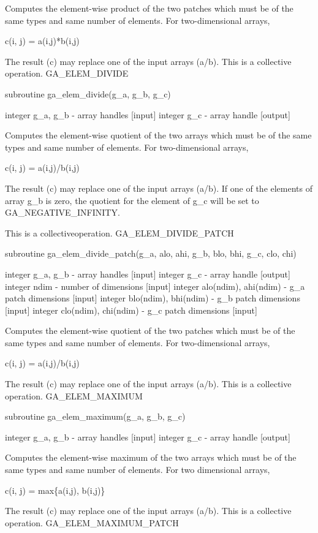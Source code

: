 Computes the element-wise product of the two patches which must be
of the same types and same number of elements. For two-dimensional
arrays,

c(i, j) = a(i,j){*}b(i,j)

The result (c) may replace one of the input arrays (a/b). This is
a collective operation. GA\_ELEM\_DIVIDE

subroutine ga\_elem\_divide(g\_a, g\_b, g\_c)

integer g\_a, g\_b - array handles {[}input{]} integer g\_c - array
handle {[}output{]}

Computes the element-wise quotient of the two arrays which must be
of the same types and same number of elements. For two-dimensional
arrays,

c(i, j) = a(i,j)/b(i,j)

The result (c) may replace one of the input arrays (a/b). If one of
the elements of array g\_b is zero, the quotient for the element of
g\_c will be set to GA\_NEGATIVE\_INFINITY.

This is a collectiveoperation. GA\_ELEM\_DIVIDE\_PATCH

subroutine ga\_elem\_divide\_patch(g\_a, alo, ahi, g\_b, blo, bhi,
g\_c, clo, chi)

integer g\_a, g\_b - array handles {[}input{]} integer g\_c - array
handle {[}output{]} integer ndim - number of dimensions {[}input{]}
integer alo(ndim), ahi(ndim) - g\_a patch dimensions {[}input{]} integer
blo(ndim), bhi(ndim) - g\_b patch dimensions {[}input{]} integer clo(ndim),
chi(ndim) - g\_c patch dimensions {[}input{]}

Computes the element-wise quotient of the two patches which must be
of the same types and same number of elements. For two-dimensional
arrays,

c(i, j) = a(i,j)/b(i,j)

The result (c) may replace one of the input arrays (a/b). This is
a collective operation. GA\_ELEM\_MAXIMUM

subroutine ga\_elem\_maximum(g\_a, g\_b, g\_c)

integer g\_a, g\_b - array handles {[}input{]} integer g\_c - array
handle {[}output{]}

Computes the element-wise maximum of the two arrays which must be
of the same types and same number of elements. For two dimensional
arrays,

c(i, j) = max\{a(i,j), b(i,j)\}

The result (c) may replace one of the input arrays (a/b). This is
a collective operation. GA\_ELEM\_MAXIMUM\_PATCH

